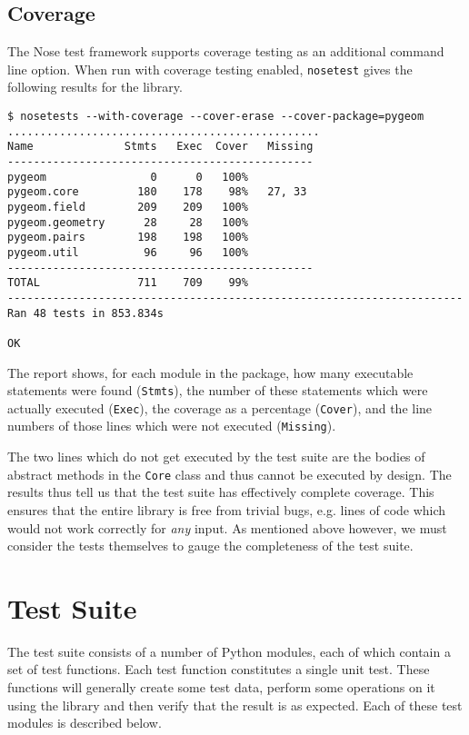 \subsection{Coverage}
The Nose test framework supports coverage testing as an additional command line option. When run with coverage testing enabled, \texttt{nosetest} gives the following results for the \pygeom library.
\begin{verbatim}
$ nosetests --with-coverage --cover-erase --cover-package=pygeom
................................................
Name              Stmts   Exec  Cover   Missing
-----------------------------------------------
pygeom                0      0   100%   
pygeom.core         180    178    98%   27, 33
pygeom.field        209    209   100%   
pygeom.geometry      28     28   100%   
pygeom.pairs        198    198   100%   
pygeom.util          96     96   100%   
-----------------------------------------------
TOTAL               711    709    99%   
----------------------------------------------------------------------
Ran 48 tests in 853.834s

OK
\end{verbatim}

The report shows, for each module in the package, how many executable statements were found (\texttt{Stmts}), the number of these statements which were actually executed (\texttt{Exec}), the coverage as a percentage (\texttt{Cover}), and the line numbers of those lines which were not executed (\texttt{Missing}).

The two lines which do not get executed by the test suite are the bodies of abstract methods in the \texttt{Core} class and thus cannot be executed by design.
The results thus tell us that the \pygeom test suite has effectively complete coverage.
This ensures that the entire library is free from trivial bugs, e.g. lines of code which would not work correctly for \emph{any} input.
As mentioned above however, we must consider the tests themselves to gauge the completeness of the test suite.

\section{\pygeom Test Suite}

The \pygeom test suite consists of a number of Python modules, each of which contain a set of test functions.
Each test function constitutes a single unit test.
These functions will generally create some test data, perform some operations on it using the \pygeom library and then verify that the result is as expected.
Each of these test modules is described below.


